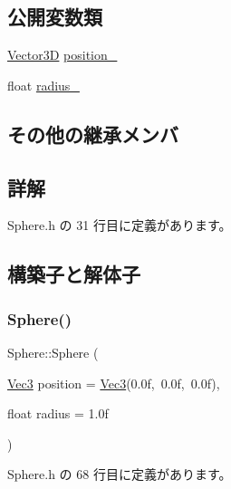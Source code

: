 \subsection*{公開変数類}
\begin{DoxyCompactItemize}
\item 
\mbox{\hyperlink{class_vector3_d}{Vector3D}} \mbox{\hyperlink{class_sphere_a5a18bfcc7abcdfbd6802ec622dfa5590}{position\+\_\+}}
\item 
float \mbox{\hyperlink{class_sphere_ac2924d9ad22bfad1ed1914c069c188dc}{radius\+\_\+}}
\end{DoxyCompactItemize}
\subsection*{その他の継承メンバ}


\subsection{詳解}


 Sphere.\+h の 31 行目に定義があります。



\subsection{構築子と解体子}
\mbox{\label{class_sphere_a00281a2ff42b3f2668fb853890447a73}} 
\subsubsection{\texorpdfstring{Sphere()}{Sphere()}}
{\footnotesize\ttfamily Sphere\+::\+Sphere (\begin{DoxyParamCaption}\item[{\mbox{\hyperlink{_vector3_d_8h_ab16f59e4393f29a01ec8b9bbbabbe65d}{Vec3}}}]{position = {\ttfamily \mbox{\hyperlink{_vector3_d_8h_ab16f59e4393f29a01ec8b9bbbabbe65d}{Vec3}}(0.0f,~0.0f,~0.0f)},  }\item[{float}]{radius = {\ttfamily 1.0f} }\end{DoxyParamCaption})\hspace{0.3cm}{\ttfamily [inline]}}



 Sphere.\+h の 68 行目に定義があります。

\mbox{\label{class_sphere_a569c071e50a3e11f678630ee1a17737e}} 
